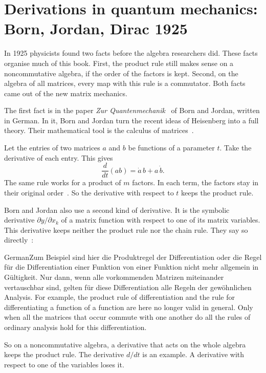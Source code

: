 \section[Derivations in quantum mechanics: Born, Jordan, Dirac 1925][Quantum mechanics]{Derivations in quantum mechanics: Born, Jordan, Dirac 1925}\label{sec:origins:physics}

In 1925 physicists found two facts before the algebra researchers did. These
facts organise much of this book. First, the product rule still makes sense
on a noncommutative algebra, if the order of the factors is kept. Second, on
the algebra of all matrices, every map with this rule is a commutator. Both
facts came out of the new matrix mechanics.

The first fact is in the paper \emph{Zur Quantenmechanik}~\cite{BornJordan1925}
of Born and Jordan, written in German. In it, Born and Jordan turn the recent ideas of Heisenberg into a
full theory. Their mathematical tool is the calculus of
matrices~\cite[p.~858]{BornJordan1925}.

Let the entries of two matrices $a$ and $b$ be functions of a parameter $t$.
Take the derivative of each entry. This gives
\[
  \frac{d}{dt}(ab) = \dot a\, b + a\, \dot b .
\]
The same rule works for a product of $m$ factors. In each term, the factors
stay in their original order~\cite[(11), (11$'$), p.~861]{BornJordan1925}.
So the derivative with respect to $t$ keeps the product rule.

Born and Jordan also use a second kind of derivative. It is the symbolic
derivative $\partial y/\partial x_k$ of a matrix function with respect to
one of its matrix variables. This derivative keeps neither the product rule
nor the chain rule. They say so directly~\cite[\S 2, p.~862]{BornJordan1925}:
\begin{originalquote}{German}{Zum Beispiel sind hier die Produktregel der Differentiation oder die Regel f\"ur die Differentiation einer Funktion von einer Funktion nicht mehr allgemein in G\"ultigkeit. Nur dann, wenn alle vorkommenden Matrizen miteinander vertauschbar sind, gelten f\"ur diese Differentiation alle Regeln der gew\"ohnlichen Analysis.}
For example, the product rule of differentiation and the rule for
differentiating a function of a function are here no longer valid in
general. Only when all the matrices that occur commute with one another do
all the rules of ordinary analysis hold for this differentiation.
\end{originalquote}
\noindent So on a noncommutative algebra, a derivative that acts on the whole algebra keeps the product rule.
The derivative $d/dt$ is an example. A derivative with respect to one of the
variables loses it.

